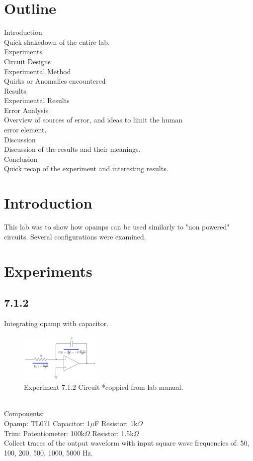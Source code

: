 \documentclass[a4paper,12pt]{article}
\begin{document}
\section*{Outline}
Introduction\\
\hspace*{1cm}Quick shakedown of the entire lab.
\\
Experiments\\
\hspace*{1cm}Circuit Designs\\
\hspace*{1cm}Experimental Method\\
\hspace*{1cm}Quirks or Anomalies encountered
\\
Results\\
\hspace*{1cm}Experimental Results
\\
Error Analysis\\
\hspace*{1cm}Overview of sources of error, and ideas to limit the human\\ \hspace*{2cm}error element.
\\
Discussion\\
\hspace*{1cm}Discussion of the results and their meanings.
\\
Conclusion\\
\hspace*{1cm}Quick recap of the experiment and interesting results.
\\
\pagebreak
\section*{Introduction}
This lab was to show how opamps can be used similarly to "non powered" circuits.  Several configurations were examined.

\section*{Experiments}
\subsection*{7.1.2}

Integrating opamp with capacitor.
\begin{figure}[h]
\centering
\includegraphics[width=1.5in]{7.1.2/Circuit_Diagram.png}
\caption{Experiment 7.1.2 Circuit *coppied from lab manual.}
\end{figure}\\
Components:\\
Opamp: TL071  Capacitor: 1$\mu$F  Resistor: 1k$\Omega$  \\Trim: Potentiometer: 100k$\Omega$ Resistor: 1.5k$\Omega$\\
Collect traces of the output waveform with input square wave frequencies of: 50, 100, 200, 500, 1000, 5000 Hz.
\newpage
\end{document}
